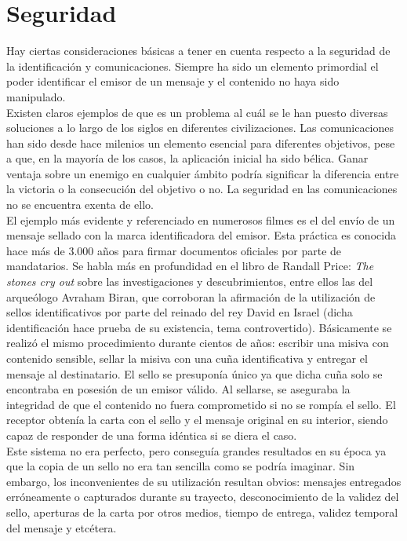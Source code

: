 \documentclass[../PFC.tex]{subfiles}
\begin{document}
\section{Seguridad}
\label{Seguridad}

Hay ciertas consideraciones básicas a tener en cuenta respecto a la seguridad de la identificación y comunicaciones. Siempre ha sido un elemento primordial el poder identificar el emisor de un mensaje y el contenido no haya sido manipulado. 
\*
\vspace{0.5515cm}
\\
Existen claros ejemplos de que es un problema al cuál se le han puesto diversas soluciones a lo largo de los siglos en diferentes civilizaciones. Las comunicaciones han sido desde hace milenios un elemento esencial para diferentes objetivos, pese a que, en la mayoría de los casos, la aplicación inicial ha sido bélica. Ganar ventaja sobre un enemigo en cualquier ámbito podría significar la diferencia entre la victoria o la consecución del objetivo o no. La seguridad en las comunicaciones no se encuentra exenta de ello. 
\*
\vspace{0.5515cm}
\\
El ejemplo más evidente y referenciado en numerosos filmes es el del envío de un mensaje sellado con la marca identificadora del emisor. Esta práctica es conocida hace más de 3.000 años para firmar documentos oficiales por parte de mandatarios. Se habla más en profundidad en el libro de Randall Price: \textit{The stones cry out}\cite{stonesCryOut} sobre las investigaciones y descubrimientos, entre ellos las del arqueólogo Avraham Biran, que corroboran la afirmación de la utilización de sellos identificativos por parte del reinado del rey David en Israel (dicha identificación hace prueba de su existencia, tema controvertido). Básicamente se realizó el mismo procedimiento durante cientos de años: escribir una misiva con contenido sensible, sellar la misiva con una cuña identificativa y entregar el mensaje al destinatario. El sello se presuponía único ya que dicha cuña solo se encontraba en posesión de un emisor válido. Al sellarse, se aseguraba la integridad de que el contenido no fuera comprometido si no se rompía el sello. El receptor obtenía la carta con el sello y el mensaje original en su interior, siendo capaz de responder de una forma idéntica si se diera el caso.
\*
\vspace{0.5515cm}
\\
Este sistema no era perfecto, pero conseguía grandes resultados en su época ya que la copia de un sello no era tan sencilla como se podría imaginar. Sin embargo, los inconvenientes de su utilización resultan obvios: mensajes entregados erróneamente o capturados durante su trayecto, desconocimiento de la validez del sello, aperturas de la carta por otros medios, tiempo de entrega, validez temporal del mensaje y etcétera.
\end{document}
